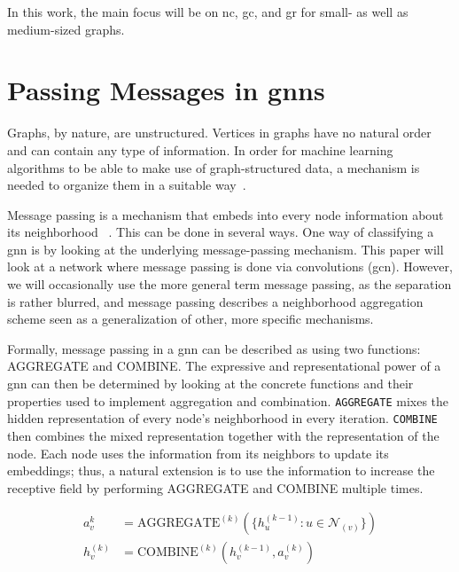 In this work, the main focus will be on \ac{nc}, \ac{gc}, and \ac{gr} for small- as well as medium-sized graphs.

\section{Passing Messages in \Acsp*{gnn}}
\label{sec:related:message}

Graphs, by nature, are unstructured.
Vertices in graphs have no natural order and can contain any type of information.
In order for machine learning algorithms to be able to make use of graph-structured data, a mechanism is needed to organize them in a
suitable way~\cite{Zhou2020a,Hamilton2017a,Zhang19}.


Message passing is a mechanism that embeds into every node information about its neighborhood ~\cite{Xu2019,Zhou2020a}.
This can be done in several ways.
One way of classifying a \ac{gnn} is by looking at the underlying message-passing mechanism.
This paper will look at a network where message passing is done via convolutions (\acf{gcn}).
However, we will occasionally use the more general term message passing, as the separation is rather blurred, and message passing describes a neighborhood aggregation scheme seen as a generalization of other, more specific mechanisms.

Formally, message passing in a \ac{gnn} can be described as using two functions:
AGGREGATE and COMBINE.
The expressive and representational power of a \ac{gnn} can then be determined by looking at the concrete functions and their properties used to implement aggregation and combination.
\texttt{AGGREGATE} mixes the hidden representation of every node's neighborhood in every iteration.
\texttt{COMBINE} then combines the mixed representation together with the representation of the node.
Each node uses the information from its neighbors to update its embeddings;
thus, a natural extension is to use the information to increase the receptive field by performing AGGREGATE and COMBINE multiple times.

\begin{align*}
    a_{v}^{k}   & = \mathrm{AGGREGATE}^{(k)}(\{h_{u}^{(k-1)}: u \in \mathcal{N}_{(v)}\}) \\
    h_{v}^{(k)} & = \mathrm{COMBINE}^{(k)}(h_{v}^{(k-1)}, a_{v}^{(k)})
\end{align*}

